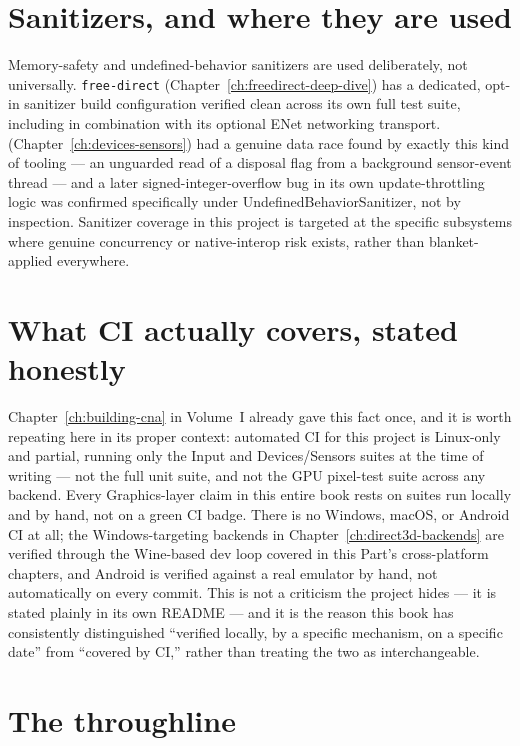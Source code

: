 \section{Sanitizers, and where they are used}

Memory-safety and undefined-behavior sanitizers are used deliberately, not universally.
\texttt{free-direct} (Chapter~\ref{ch:freedirect-deep-dive}) has a dedicated, opt-in sanitizer
build configuration verified clean across its own full test suite, including in combination
with its optional ENet networking transport. 
(Chapter~\ref{ch:devices-sensors}) had a genuine data race found by exactly this kind of
tooling --- an unguarded read of a disposal flag from a background sensor-event thread --- and
a later signed-integer-overflow bug in its own update-throttling logic was confirmed
specifically under UndefinedBehaviorSanitizer, not by inspection. Sanitizer coverage in this
project is targeted at the specific subsystems where genuine concurrency or native-interop
risk exists, rather than blanket-applied everywhere.

\section{What CI actually covers, stated honestly}

Chapter~\ref{ch:building-cna} in Volume~I already gave this fact once, and it is worth
repeating here in its proper context: automated CI for this project is Linux-only and
partial, running only the Input and Devices/Sensors suites at the time of writing --- not the
full unit suite, and not the GPU pixel-test suite across any backend. Every Graphics-layer
claim in this entire book rests on suites run locally and by hand, not on a green CI badge.
There is no Windows, macOS, or Android CI at all; the Windows-targeting backends in
Chapter~\ref{ch:direct3d-backends} are verified through the Wine-based dev loop covered in
this Part's cross-platform chapters, and Android is verified against a real emulator by hand,
not automatically on every commit. This is not a criticism the project hides --- it is stated
plainly in its own README --- and it is the reason this book has consistently distinguished
``verified locally, by a specific mechanism, on a specific date'' from ``covered by CI,''
rather than treating the two as interchangeable.

\section{The throughline}

